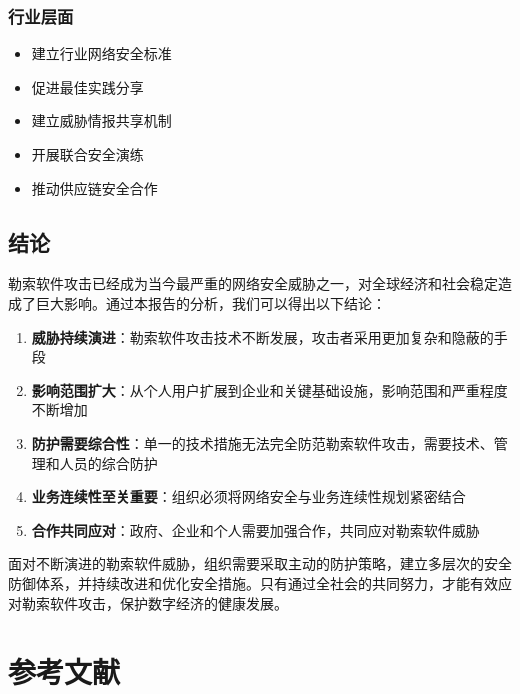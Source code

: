\documentclass[12pt,a4paper]{article}
\begin{document}
\subsubsection{行业层面}
\begin{itemize}
    \item 建立行业网络安全标准
    \item 促进最佳实践分享
    \item 建立威胁情报共享机制
    \item 开展联合安全演练
    \item 推动供应链安全合作
\end{itemize}

\subsection{结论}

勒索软件攻击已经成为当今最严重的网络安全威胁之一，对全球经济和社会稳定造成了巨大影响。通过本报告的分析，我们可以得出以下结论：

\begin{enumerate}
    \item \textbf{威胁持续演进}：勒索软件攻击技术不断发展，攻击者采用更加复杂和隐蔽的手段
    \item \textbf{影响范围扩大}：从个人用户扩展到企业和关键基础设施，影响范围和严重程度不断增加
    \item \textbf{防护需要综合性}：单一的技术措施无法完全防范勒索软件攻击，需要技术、管理和人员的综合防护
    \item \textbf{业务连续性至关重要}：组织必须将网络安全与业务连续性规划紧密结合
    \item \textbf{合作共同应对}：政府、企业和个人需要加强合作，共同应对勒索软件威胁
\end{enumerate}

面对不断演进的勒索软件威胁，组织需要采取主动的防护策略，建立多层次的安全防御体系，并持续改进和优化安全措施。只有通过全社会的共同努力，才能有效应对勒索软件攻击，保护数字经济的健康发展。

\section{参考文献}
\end{document}
